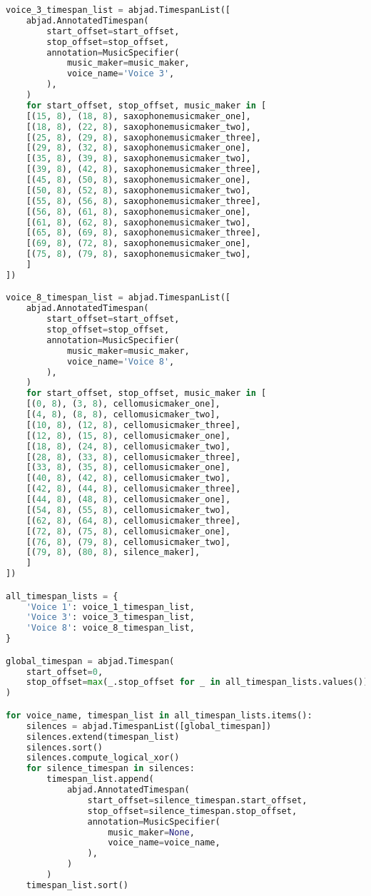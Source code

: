 \begin{lstlisting}[language=Python, caption=Four Ages of Sand Segment\_III]
voice_3_timespan_list = abjad.TimespanList([
    abjad.AnnotatedTimespan(
        start_offset=start_offset,
        stop_offset=stop_offset,
        annotation=MusicSpecifier(
            music_maker=music_maker,
            voice_name='Voice 3',
        ),
    )
    for start_offset, stop_offset, music_maker in [
    [(15, 8), (18, 8), saxophonemusicmaker_one],
    [(18, 8), (22, 8), saxophonemusicmaker_two],
    [(25, 8), (29, 8), saxophonemusicmaker_three],
    [(29, 8), (32, 8), saxophonemusicmaker_one],
    [(35, 8), (39, 8), saxophonemusicmaker_two],
    [(39, 8), (42, 8), saxophonemusicmaker_three],
    [(45, 8), (50, 8), saxophonemusicmaker_one],
    [(50, 8), (52, 8), saxophonemusicmaker_two],
    [(55, 8), (56, 8), saxophonemusicmaker_three],
    [(56, 8), (61, 8), saxophonemusicmaker_one],
    [(61, 8), (62, 8), saxophonemusicmaker_two],
    [(65, 8), (69, 8), saxophonemusicmaker_three],
    [(69, 8), (72, 8), saxophonemusicmaker_one],
    [(75, 8), (79, 8), saxophonemusicmaker_two],
    ]
])

voice_8_timespan_list = abjad.TimespanList([
    abjad.AnnotatedTimespan(
        start_offset=start_offset,
        stop_offset=stop_offset,
        annotation=MusicSpecifier(
            music_maker=music_maker,
            voice_name='Voice 8',
        ),
    )
    for start_offset, stop_offset, music_maker in [
    [(0, 8), (3, 8), cellomusicmaker_one],
    [(4, 8), (8, 8), cellomusicmaker_two],
    [(10, 8), (12, 8), cellomusicmaker_three],
    [(12, 8), (15, 8), cellomusicmaker_one],
    [(18, 8), (24, 8), cellomusicmaker_two],
    [(28, 8), (33, 8), cellomusicmaker_three],
    [(33, 8), (35, 8), cellomusicmaker_one],
    [(40, 8), (42, 8), cellomusicmaker_two],
    [(42, 8), (44, 8), cellomusicmaker_three],
    [(44, 8), (48, 8), cellomusicmaker_one],
    [(54, 8), (55, 8), cellomusicmaker_two],
    [(62, 8), (64, 8), cellomusicmaker_three],
    [(72, 8), (75, 8), cellomusicmaker_one],
    [(76, 8), (79, 8), cellomusicmaker_two],
    [(79, 8), (80, 8), silence_maker],
    ]
])

all_timespan_lists = {
    'Voice 1': voice_1_timespan_list,
    'Voice 3': voice_3_timespan_list,
    'Voice 8': voice_8_timespan_list,
}

global_timespan = abjad.Timespan(
    start_offset=0,
    stop_offset=max(_.stop_offset for _ in all_timespan_lists.values())
)

for voice_name, timespan_list in all_timespan_lists.items():
    silences = abjad.TimespanList([global_timespan])
    silences.extend(timespan_list)
    silences.sort()
    silences.compute_logical_xor()
    for silence_timespan in silences:
        timespan_list.append(
            abjad.AnnotatedTimespan(
                start_offset=silence_timespan.start_offset,
                stop_offset=silence_timespan.stop_offset,
                annotation=MusicSpecifier(
                    music_maker=None,
                    voice_name=voice_name,
                ),
            )
        )
    timespan_list.sort()


\end{lstlisting}
